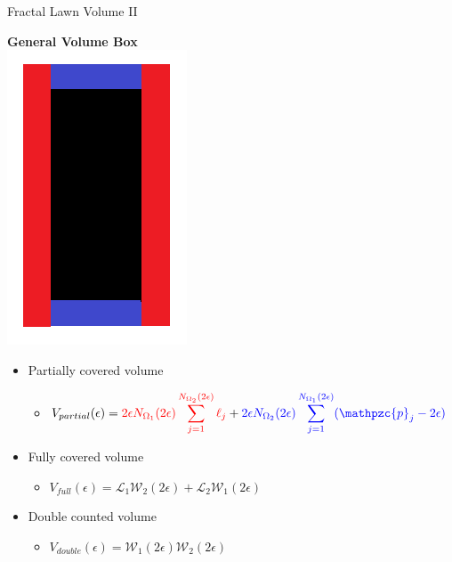 \documentclass{if-beamer}
\newcommand{\SL}{\mathcal{L}}
\newcommand{\W}{\mathcal{W}}
\newcommand{\p}{\mathpzc{p}}
\newcommand{\Om}{\Omega}
\begin{document}
\begin{frame}{Fractal Lawn Volume II}
	\begin{center}
		{\bf General Volume Box} \\
		\includegraphics[scale=0.25]{VolumeBox.png}
	\end{center}
	\pause
	\vspace{0.2in}
	
	\begin{itemize}
		\item Partially covered volume
		\begin{itemize}
			\item $\displaystyle V_{partial}(\epsilon)=\textcolor{red}{2\epsilon N_{\Om_1}(2\epsilon)\sum_{j=1}^{N_{\Om_2}(2\epsilon)} \ell_j} + \textcolor{blue}{2\epsilon N_{\Om_2}(2\epsilon)\sum_{j=1}^{N_{\Om_1}(2\epsilon)} (\p_j - 2\epsilon)}$
		\end{itemize}
		\pause
		
		\item Fully covered volume
		\begin{itemize}
			\item $\displaystyle V_{full}(\epsilon)=\SL_1 \W_2(2\epsilon) + \SL_2 \W_1(2\epsilon)$
		\end{itemize}
		\pause
		
		\item Double counted volume
		\begin{itemize}
			\item $V_{double}(\epsilon)=\W_1(2\epsilon) \W_2(2\epsilon)$
		\end{itemize}
	\end{itemize}
	
\end{frame}
\end{document}
